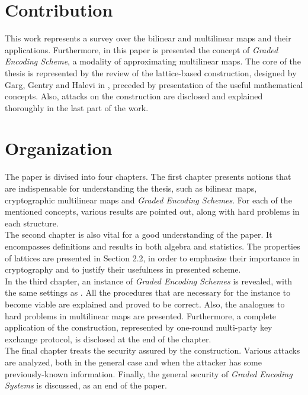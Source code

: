 \section*{Contribution}

This work represents a survey over the bilinear and multilinear maps and their applications. Furthermore, in this paper is presented the concept of \textit{Graded Encoding Scheme}, a modality of approximating multilinear maps. The core of the thesis is represented by the review of the lattice-based construction, designed by Garg, Gentry and Halevi in \cite{GGH13}, preceded by presentation of the useful mathematical concepts. Also, attacks on the construction are disclosed and explained thoroughly in the last part of the work.

\section*{Organization}

The paper is divised into four chapters. The first chapter presents notions that are indispensable for understanding the thesis, such as bilinear maps, cryptographic multilinear maps and \textit{Graded Encoding Schemes}. For each of the mentioned concepts, various results are pointed out, along with hard problems in each structure. \\

The second chapter is also vital for a good understanding of the paper. It encompasses definitions and results in both algebra and statistics. The properties of lattices are presented in Section 2.2, in order to emphasize their importance in cryptography and to justify their usefulness in presented scheme.\\

In the third chapter, an instance of \textit{Graded Encoding Schemes} is revealed, with the same settings as \cite{GGH13}. All the procedures that are necessary for the instance to become viable are explained and proved to be correct. Also, the analogues to hard problems in multilinear maps are presented. Furthermore, a complete application of the construction, represented by one-round multi-party key exchange protocol, is disclosed at the end of the chapter.\\

The final chapter treats the security assured by the construction. Various attacks are analyzed,  both in the general case and when the attacker has some previously-known information. Finally, the general security of \textit{Graded Encoding Systems} is discussed, as an end of the paper.